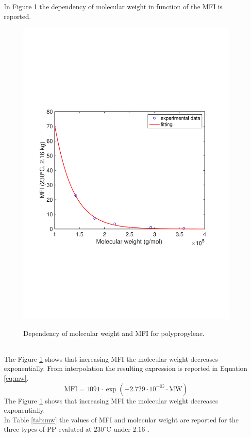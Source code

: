 \documentclass[a4paper, 11pt]{article}
\begin{document}
In Figure \ref{fig:mw} the dependency of molecular weight in function of the MFI is reported.
\begin{figure}[h!]
	\centering
	{\includegraphics[scale=0.4]{mw}}
	\captionsetup{justification=centering}
	\caption{Dependency of molecular weight and MFI for polypropylene.}
	\label{fig:mw}
\end{figure}\\
The Figure \ref{fig:mw} shows that increasing MFI the molecular weight decreases exponentially. From interpolation the resulting expression is reported in Equation \ref{eq:mw}. 
\begin{equation}
\text{MFI} = 1091\cdot \exp({-2.729\cdot 10^{-05}\cdot\text{MW}})
\label{eq:mw}
\end{equation}
The Figure \ref{fig:mw} shows that increasing MFI the molecular weight decreases exponentially.\\ In Table \ref{tab:mw} the values of MFI and molecular weight are reported for the three types of PP evaluted at $230 ^\circ$C under $2.16$ .
\end{document}
